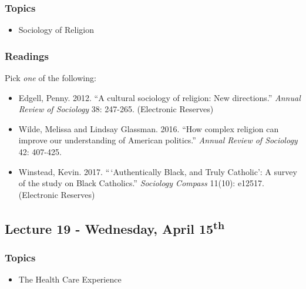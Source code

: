 \documentclass[]{book}
\providecommand{\tightlist}{%
  \setlength{\itemsep}{0pt}\setlength{\parskip}{0pt}}
\begin{document}
\hypertarget{topics-24}{%
\subsubsection*{Topics}\label{topics-24}}

\begin{itemize}
\tightlist
\item
  Sociology of Religion
\end{itemize}

\hypertarget{readings-22}{%
\subsubsection*{Readings}\label{readings-22}}

Pick \emph{one} of the following:

\begin{itemize}
\tightlist
\item
  Edgell, Penny. 2012. ``A cultural sociology of religion: New directions.'' \emph{Annual Review of Sociology} 38: 247-265. (Electronic Reserves)
\item
  Wilde, Melissa and Lindsay Glassman. 2016. ``How complex religion can improve our understanding of American politics.'' \emph{Annual Review of Sociology} 42: 407-425.
\item
  Winstead, Kevin. 2017. ``\,`Authentically Black, and Truly Catholic': A survey of the study on Black Catholics.'' \emph{Sociology Compass} 11(10): e12517. (Electronic Reserves)
\end{itemize}

\hypertarget{lecture-19---wednesday-april-15th}{%
\subsection*{\texorpdfstring{Lecture 19 - Wednesday, April 15\textsuperscript{th}}{Lecture 19 - Wednesday, April 15th}}\label{lecture-19---wednesday-april-15th}}

\hypertarget{topics-25}{%
\subsubsection*{Topics}\label{topics-25}}

\begin{itemize}
\tightlist
\item
  The Health Care Experience
\end{itemize}
\end{document}
